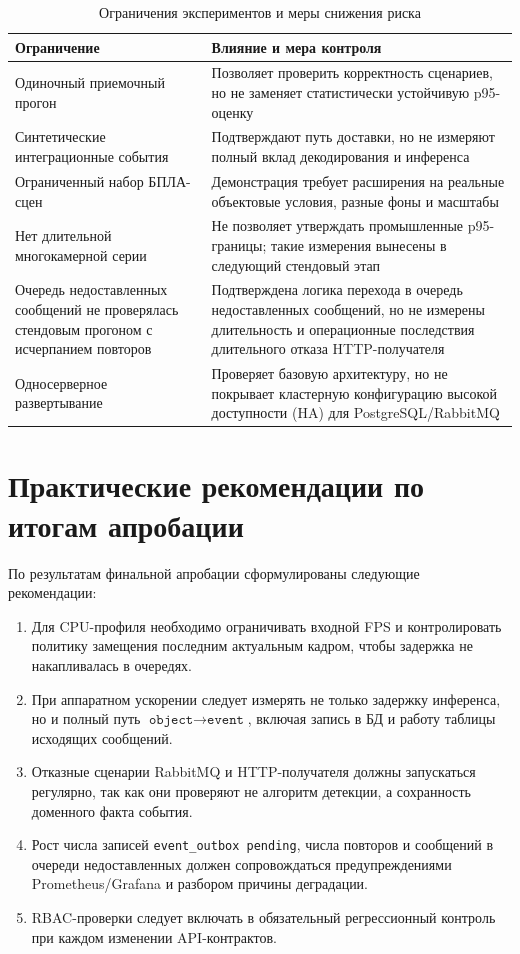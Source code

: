 \begin{table}[H]
\caption{Ограничения экспериментов и меры снижения риска}
\label{tab:validity_threats}
\begin{tabularx}{\textwidth}{>{\raggedright\arraybackslash}p{}>{\raggedright\arraybackslash}X}
\toprule
Ограничение & Влияние и мера контроля \\
\midrule
Одиночный приемочный прогон & Позволяет проверить корректность сценариев, но не заменяет статистически устойчивую p95-оценку \\
Синтетические интеграционные события & Подтверждают путь доставки, но не измеряют полный вклад декодирования и инференса \\
Ограниченный набор БПЛА-сцен & Демонстрация требует расширения на реальные объектовые условия, разные фоны и масштабы \\
Нет длительной многокамерной серии & Не позволяет утверждать промышленные p95-границы; такие измерения вынесены в следующий стендовый этап \\
Очередь недоставленных сообщений не проверялась стендовым прогоном с исчерпанием повторов & Подтверждена логика перехода в очередь недоставленных сообщений, но не измерены длительность и операционные последствия длительного отказа HTTP-получателя \\
Односерверное развертывание & Проверяет базовую архитектуру, но не покрывает кластерную конфигурацию высокой доступности (HA) для PostgreSQL/RabbitMQ \\
\bottomrule
\end{tabularx}
\end{table}

\section{Практические рекомендации по итогам апробации}

По результатам финальной апробации сформулированы следующие рекомендации:
\begin{enumerate}
    \item Для CPU-профиля необходимо ограничивать входной FPS и контролировать политику замещения последним актуальным кадром, чтобы задержка не накапливалась в очередях.
    \item При аппаратном ускорении следует измерять не только задержку инференса, но и полный путь \(\texttt{object}\rightarrow\texttt{event}\), включая запись в БД и работу таблицы исходящих сообщений.
    \item Отказные сценарии RabbitMQ и HTTP-получателя должны запускаться регулярно, так как они проверяют не алгоритм детекции, а сохранность доменного факта события.
    \item Рост числа записей \texttt{event\_outbox pending}, числа повторов и сообщений в очереди недоставленных должен сопровождаться предупреждениями Prometheus/Grafana и разбором причины деградации.
    \item RBAC-проверки следует включать в обязательный регрессионный контроль при каждом изменении API-контрактов.
\end{enumerate}

